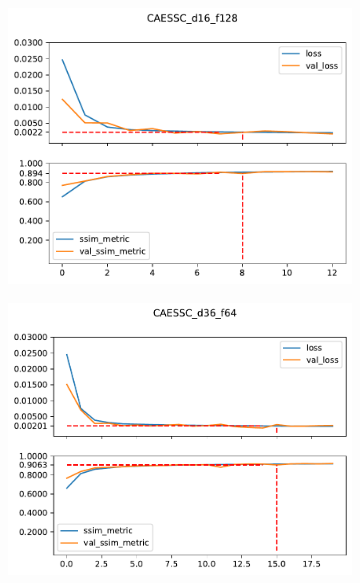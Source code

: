 \begin{figure}[H]
    \begin{subfigure}{\textwidth}
        \centering
        \includegraphics[height=0.37\textheight,keepaspectratio]{subsections/caessc/plot_history_CAESSC_d16_f128.pdf}
    \end{subfigure}
    \begin{subfigure}{\textwidth}
        \centering
        \includegraphics[height=0.37\textheight,keepaspectratio]{subsections/caessc/plot_history_CAESSC_d36_f64.pdf}
    \end{subfigure}
\end{figure} 

